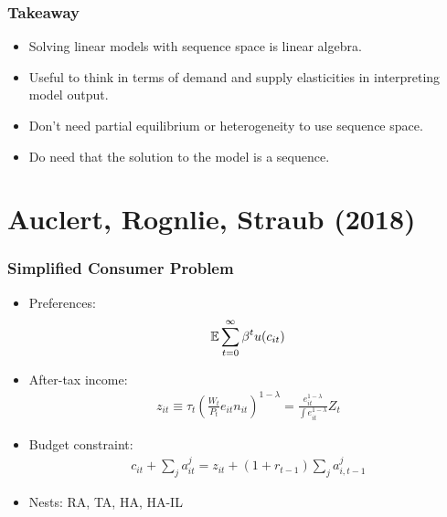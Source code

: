 \documentclass[english,xcolor=svgnames]{beamer}
\begin{document}
\begin{frame}
    \frametitle{Takeaway}
    \begin{itemize}
        \item Solving linear models with sequence space is linear algebra.
        \item Useful to think in terms of demand and supply elasticities in interpreting model output.
        \item Don't need partial equilibrium or heterogeneity to use sequence space.
        \item Do need that the solution to the model is a sequence.
\end{itemize}
\end{frame}

\section{Auclert, Rognlie, Straub (2018)}


\begin{frame}
    \frametitle{Simplified Consumer Problem}
    \begin{itemize}
        \item Preferences:
        \begin{align*}
        	\mathbb{E} \sum_{t=0}^{\infty} \beta^t u(c_{it})
        \end{align*}
        \item After-tax income: 
        \begin{align*}
        	z_{it}\equiv \tau_t \left(\frac{W_t}{P_t}e_{it}n_{it}\right)^{1-\lambda} = \frac{e_{it}^{1-\lambda}}{\int e_{it}^{1-\lambda}} Z_t
        \end{align*}
        \item Budget constraint:
        \begin{align*}
        	c_{it} + \sum_j a_{it}^j = z_{it} + (1+r_{t-1})\sum_j a_{i,t-1}^j
        \end{align*}
        \item Nests: RA, TA, HA, HA-IL
	\end{itemize}
\end{frame}
\end{document}
